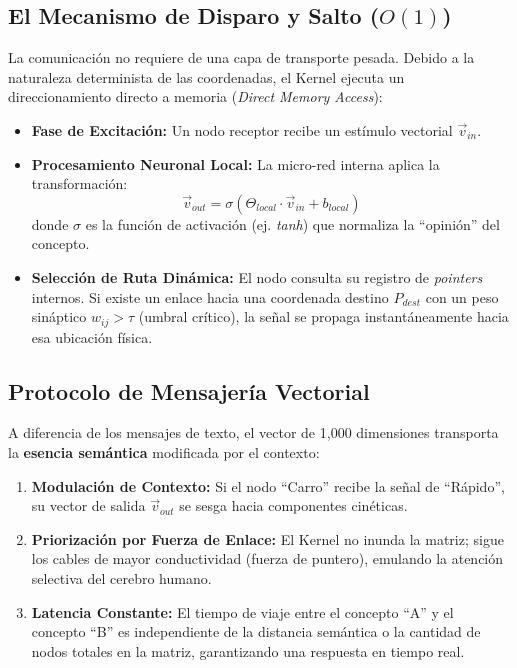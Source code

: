 \documentclass[12pt]{article}
\begin{document}
\subsection{El Mecanismo de Disparo y Salto ($O(1)$)}
La comunicación no requiere de una capa de transporte pesada. Debido a la naturaleza determinista de las coordenadas, el Kernel ejecuta un direccionamiento directo a memoria (\textit{Direct Memory Access}):
\begin{itemize}
    \item \textbf{Fase de Excitación:} Un nodo receptor recibe un estímulo vectorial $\vec{v}_{in}$.
    \item \textbf{Procesamiento Neuronal Local:} La micro-red interna aplica la transformación: 
    \[ \vec{v}_{out} = \sigma(\Theta_{local} \cdot \vec{v}_{in} + b_{local}) \]
    donde $\sigma$ es la función de activación (ej. \textit{tanh}) que normaliza la ``opinión'' del concepto.
    \item \textbf{Selección de Ruta Dinámica:} El nodo consulta su registro de \textit{pointers} internos. Si existe un enlace hacia una coordenada destino $P_{dest}$ con un peso sináptico $w_{ij} > \tau$ (umbral crítico), la señal se propaga instantáneamente hacia esa ubicación física.
\end{itemize}

\subsection{Protocolo de Mensajería Vectorial}
A diferencia de los mensajes de texto, el vector de 1,000 dimensiones transporta la \textbf{esencia semántica} modificada por el contexto:
\begin{enumerate}
    \item \textbf{Modulación de Contexto:} Si el nodo ``Carro'' recibe la señal de ``Rápido'', su vector de salida $\vec{v}_{out}$ se sesga hacia componentes cinéticas.
    \item \textbf{Priorización por Fuerza de Enlace:} El Kernel no inunda la matriz; sigue los cables de mayor conductividad (fuerza de puntero), emulando la atención selectiva del cerebro humano.
    \item \textbf{Latencia Constante:} El tiempo de viaje entre el concepto ``A'' y el concepto ``B'' es independiente de la distancia semántica o la cantidad de nodos totales en la matriz, garantizando una respuesta en tiempo real.
\end{enumerate}
\end{document}
